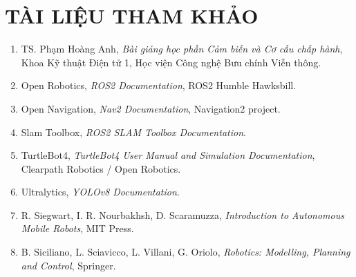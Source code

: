 ﻿\newpage
\section*{TÀI LIỆU THAM KHẢO}

\begin{enumerate}
    \item TS. Phạm Hoàng Anh, \textit{Bài giảng học phần Cảm biến và Cơ cấu chấp hành}, Khoa Kỹ thuật Điện tử 1, Học viện Công nghệ Bưu chính Viễn thông.
    \item Open Robotics, \textit{ROS2 Documentation}, ROS2 Humble Hawksbill.
    \item Open Navigation, \textit{Nav2 Documentation}, Navigation2 project.
    \item Slam Toolbox, \textit{ROS2 SLAM Toolbox Documentation}.
    \item TurtleBot4, \textit{TurtleBot4 User Manual and Simulation Documentation}, Clearpath Robotics / Open Robotics.
    \item Ultralytics, \textit{YOLOv8 Documentation}.
    \item R. Siegwart, I. R. Nourbakhsh, D. Scaramuzza, \textit{Introduction to Autonomous Mobile Robots}, MIT Press.
    \item B. Siciliano, L. Sciavicco, L. Villani, G. Oriolo, \textit{Robotics: Modelling, Planning and Control}, Springer.
\end{enumerate}
